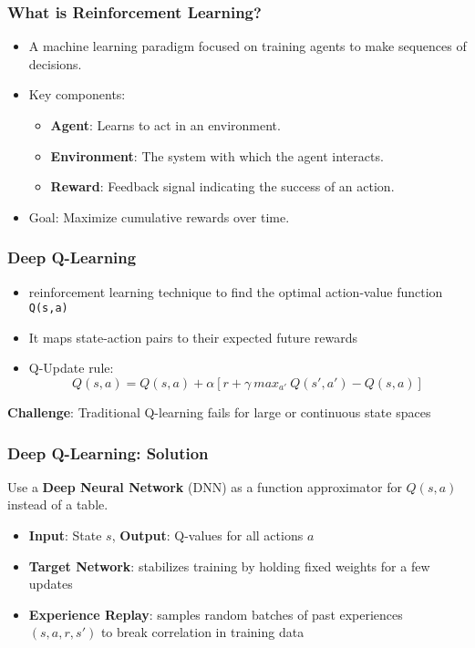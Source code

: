 \begin{frame}
	\frametitle{What is Reinforcement Learning?}
	\vspace{0.5cm}
	\begin{itemize}
		\item A machine learning paradigm focused on training agents to make sequences of decisions.
		\item Key components:
		\begin{itemize}
			\item \textbf{Agent}: Learns to act in an environment.
			\item \textbf{Environment}: The system with which the agent interacts.
			\item  \textbf{Reward}: Feedback signal indicating the success of an action.
		\end{itemize}
		\item Goal: Maximize cumulative rewards over time.
	\end{itemize}
\end{frame}



\begin{frame}
	\frametitle{Deep Q-Learning}
	\vspace{0.5cm}
		\begin{itemize}		
			\item reinforcement learning technique to find the optimal action-value function \texttt{Q(s,a)}
			\item It maps state-action pairs to their expected future rewards
			\item Q-Update rule: $$Q(s,a) = Q(s,a) +  \alpha [r + \gamma  \ max_{a'} \ Q(s',a') - Q(s,a)]$$
		\end{itemize}
		\vspace{1cm}
		\pause
		\centering
		\textbf{Challenge}: Traditional Q-learning fails for large or continuous state spaces
\end{frame}

\begin{frame}
	\frametitle{Deep Q-Learning: Solution }
	\vspace{0.5cm}
	Use a \textbf{Deep Neural Network} (DNN) as a function approximator for $Q(s,a)$ instead of a table.
		\begin{itemize}		
			\item  \textbf{Input}: State $s$, \textbf{Output}: Q-values for all actions $a$
			\item \textbf{Target Network}: stabilizes training by holding fixed weights for a few updates
			\item \textbf{Experience Replay}: samples random batches of past experiences $(s,a,r,s')$ to break correlation in training data
		\end{itemize}
\end{frame}


